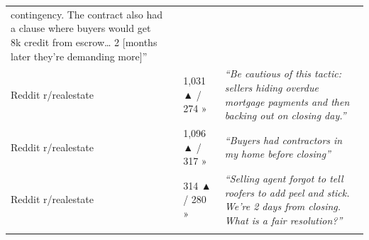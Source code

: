 \documentclass[
  10pt,
]{article}
\let\origtexttt\texttt
\renewcommand{\texttt}[1]{\origtexttt{\seqsplit{#1}}}
\begin{document}
\begin{longtable}[]{@{}llll@{}}
\begin{minipage}[t]{0.44\columnwidth}
{contingency. The contract also had a clause where buyers would get 8k credit from escrow\ldots{} 2
{[}months later they're demanding more{]}''}\strut
\end{minipage}\tabularnewline
\begin{minipage}[t]{0.20\columnwidth}\raggedright
Reddit r/realestate\strut
\end{minipage} & \begin{minipage}[t]{0.14\columnwidth}\raggedright
\texttt{1nrg7w1}\strut
\end{minipage} & \begin{minipage}[t]{0.10\columnwidth}\raggedright
1,031 ▲ / 274 »\strut
\end{minipage} & \begin{minipage}[t]{0.44\columnwidth}\raggedright
\emph{``Be cautious of this tactic: sellers hiding overdue mortgage payments and then backing out on
closing day.''}\strut
\end{minipage}\tabularnewline
\begin{minipage}[t]{0.20\columnwidth}\raggedright
Reddit r/realestate\strut
\end{minipage} & \begin{minipage}[t]{0.14\columnwidth}\raggedright
\texttt{1o2ipb4}\strut
\end{minipage} & \begin{minipage}[t]{0.10\columnwidth}\raggedright
1,096 ▲ / 317 »\strut
\end{minipage} & \begin{minipage}[t]{0.44\columnwidth}\raggedright
\emph{``Buyers had contractors in my home before closing''}\strut
\end{minipage}\tabularnewline
\begin{minipage}[t]{0.20\columnwidth}\raggedright
Reddit r/realestate\strut
\end{minipage} & \begin{minipage}[t]{0.14\columnwidth}\raggedright
\texttt{1muehvg}\strut
\end{minipage} & \begin{minipage}[t]{0.10\columnwidth}\raggedright
314 ▲ / 280 »\strut
\end{minipage} & \begin{minipage}[t]{0.44\columnwidth}\raggedright
\emph{``Selling agent forgot to tell roofers to add peel and stick. We're 2 days from closing. What
is a fair resolution?''}\strut
\end{minipage}\tabularnewline
\begin{minipage}[t]{0.20\columnwidth}\raggedright

\end{minipage}
\end{longtable}
\end{document}
